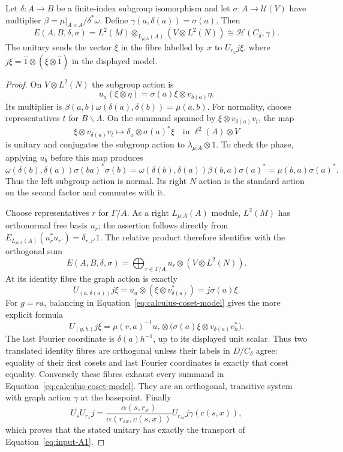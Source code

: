 \begin{lemma}
\label{lem:models-graph}
Let $\delta:A\to B$ be a finite-index subgroup isomorphism and let
$\sigma:A\to\mathcal U(V)$ have multiplier
$\beta=\mu|_{A\times A}/\delta^*\omega$.  Define
$\gamma(a,\delta(a))=\sigma(a)$.  Then
\[
 E(A,B,\delta,\sigma)=
 L^2(M)\mathbin{\bar\otimes}_{L_{\mu|A}(A)}
       (V\otimes L^2(N))
 \cong\mathcal H(C_\delta,\gamma).
\]
The unitary sends the vector $\xi$ in the fibre labelled by $x$ to
$U_{r_x}j\xi$, where
$j\xi=\widehat1\otimes(\xi\otimes\widehat1)$ in the displayed model.
\end{lemma}

\begin{proof}
On $V\otimes L^2(N)$ the subgroup action is
\[
 u_a(\xi\otimes\eta)=\sigma(a)\xi\otimes v_{\delta(a)}\eta.
\]
Its multiplier is $\beta(a,b)\omega(\delta(a),\delta(b))=\mu(a,b)$.
For normality, choose representatives $t$ for $B\backslash\Lambda$.
On the summand spanned by $\xi\otimes v_{\delta(a)}v_t$, the map
\begin{equation}\label{eq:calculus-absorption}
 \xi\otimes v_{\delta(a)}v_t
 \longmapsto\delta_a\otimes\sigma(a)^*\xi
 \quad\text{in }\ell^2(A)\otimes V
\end{equation}
is unitary and conjugates the subgroup action to
$\lambda_{\mu|A}\otimes1$.  To check the phase, applying $u_b$
before this map produces
\[
 \omega(\delta(b),\delta(a))
 \sigma(ba)^*\sigma(b)
 =\omega(\delta(b),\delta(a))\beta(b,a)\sigma(a)^*
 =\mu(b,a)\sigma(a)^*.
\]
Thus the left subgroup action is normal.  Its right $N$ action is
the standard action on the second factor and commutes with it.

Choose representatives $r$ for $\Gamma/A$.  As a right
$L_{\mu|A}(A)$ module, $L^2(M)$ has orthonormal free basis $u_r$;
the assertion follows directly from
$E_{L_{\mu|A}(A)}(u_r^*u_{r'})=\delta_{r,r'}1$.
The relative product therefore identifies with the orthogonal sum
\begin{equation}\label{eq:calculus-coset-model}
 E(A,B,\delta,\sigma)
 =\bigoplus_{r\in\Gamma/A}u_r\otimes(V\otimes L^2(N)).
\end{equation}
At its identity fibre the graph action is exactly
\[
 U_{(a,\delta(a))}j\xi
 =u_a\otimes(\xi\otimes v_{\delta(a)}^*)
 =j\sigma(a)\xi.
\]
For $g=ra$, balancing in Equation~\eqref{eq:calculus-coset-model}
gives the more explicit formula
\[
 U_{(g,h)}j\xi
 =\mu(r,a)^{-1}u_r\otimes
       \bigl(\sigma(a)\xi\otimes v_{\delta(a)}v_h^*\bigr).
\]
The last Fourier coordinate is $\delta(a)h^{-1}$, up to its displayed
unit scalar.  Thus two translated identity fibres are orthogonal
unless their labels in $D/C_\delta$ agree: equality of their first
cosets and last Fourier coordinates is exactly that coset equality.
Conversely these fibres exhaust every summand in
Equation~\eqref{eq:calculus-coset-model}.  They are an orthogonal,
transitive system with graph action $\gamma$ at the basepoint.
Finally
\[
 U_sU_{r_x}j
 =\frac{\alpha(s,r_x)}{\alpha(r_{sx},c(s,x))}
       U_{r_{sx}}j\gamma(c(s,x)),
\]
which proves that the stated unitary has exactly the transport
of Equation~\eqref{eq:input-A1}.
\end{proof}


